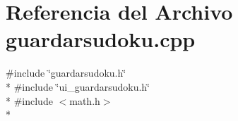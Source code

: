 \section{Referencia del Archivo guardarsudoku.\-cpp}
\label{guardarsudoku_8cpp}
{\ttfamily \#include \char`\"{}guardarsudoku.\-h\char`\"{}}\\*
{\ttfamily \#include \char`\"{}ui\-\_\-guardarsudoku.\-h\char`\"{}}\\*
{\ttfamily \#include $<$math.\-h$>$}\\*
